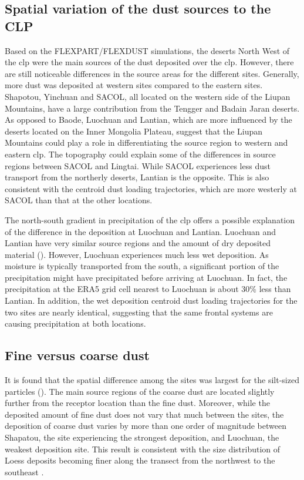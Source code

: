 \subsection{Spatial variation of the dust sources to the CLP}\label{sec:spatial_differences}
Based on the FLEXPART/FLEXDUST simulations, the deserts North West of the \acrshort{clp} were the main sources of the dust deposited over the \acrshort{clp}. 
However, there are still noticeable differences in the source areas for the different sites.
Generally, more dust was deposited at western sites compared to the eastern sites.  Shapotou, Yinchuan and SACOL, all located on the western side of the Liupan Mountains, have a large contribution from the Tengger and Badain Jaran deserts. As opposed to Baode, Luochuan and Lantian, which are more influenced by the deserts located on the Inner Mongolia Plateau, suggest that the Liupan Mountains could play a role in differentiating the source region to western and eastern \acrshort{clp}.
The topography could explain some of the differences in source regions between SACOL and Lingtai. While SACOL experiences less dust transport from the northerly deserts, Lantian is the opposite. This is also consistent with the centroid dust loading trajectories, which are more westerly at SACOL than that at the other locations. 

The north-south gradient in precipitation of the \acrshort{clp} offers a possible explanation of the difference in the deposition at Luochuan and Lantian. Luochuan and Lantian have very similar source regions and the amount of dry deposited material (). 
However, Luochuan experiences much less wet deposition. 
As moisture is typically transported from the south, a significant portion of the precipitation might have precipitated before arriving at Luochuan. 
In fact, the precipitation at the ERA5 grid cell nearest to Luochuan is about 30\% less than Lantian. In addition, the wet deposition centroid dust loading trajectories for the two sites are nearly identical, suggesting that the same frontal systems are causing precipitation at both locations.  


\subsection{Fine versus coarse dust}\label{sec:fine_vs_coarse}
It is found that the spatial difference among the sites was largest for the silt-sized particles ().
The main source regions of the coarse dust are located slightly further from the receptor location than the fine dust. 
Moreover, while the deposited amount of fine dust does not vary that much between the sites, the deposition of coarse dust varies by more than one order of magnitude between Shapatou, the site experiencing the strongest deposition, and Luochuan, the weakest deposition site. 
This result is consistent with the size distribution of Loess deposits becoming finer along the transect from the northwest to the southeast \parencite{ding2000re,sun2003seasonal}.

